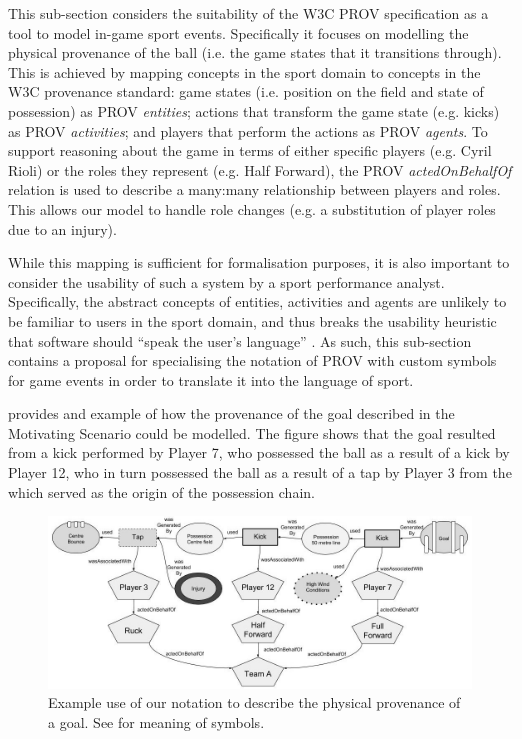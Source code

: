 {This sub-section considers the suitability of the W3C PROV
specification as a tool to model in-game sport events. Specifically it
focuses on modelling the physical provenance of the ball (i.e. the game
states that it transitions through). This is achieved by mapping concepts in the
sport domain to concepts in the W3C provenance standard: game states (i.e. position on the field and state
of possession) as PROV \textit{entities}; actions that transform the game
state (e.g. kicks) as PROV \textit{activities}; and players that perform the
actions as PROV \textit{agents}. To support reasoning about the game in terms
of either specific players (e.g. Cyril Rioli) or the roles they
represent (e.g. Half Forward), the PROV
\textit{actedOnBehalfOf} relation is used to describe a many:many relationship
between players and roles. This allows our model to handle role changes
(e.g. a substitution of player roles due to an injury).}

{}

{While this mapping is sufficient for formalisation purposes, it is also important
to consider the usability of such a system by a sport performance
analyst. Specifically, the abstract concepts of entities, activities and
agents are unlikely to be familiar to users in the sport domain, and
thus breaks the usability heuristic that software should ``speak the
user's language'' \cite{Nielsen1994}. As such, this sub-section contains a proposal for specialising
the notation of PROV with custom symbols for game events in order to
translate it into the language of sport.

{ provides and example of how the provenance of the goal described in
the Motivating Scenario could be modelled. The figure shows that the goal resulted from a kick performed by Player 7, who
possessed the ball as a result of a kick by Player 12, who in turn
possessed the ball as a result of a tap by Player 3 from the \centrebounce{} which served as the origin of the possession chain.}

\begin{figure}[!htb]
\includegraphics[width=\linewidth]{figs/paper/image2.jpg}
\caption{Example use of our notation to describe the
physical provenance of a goal. See  for meaning of symbols.}
\label{PhysExample}
\end{figure}
}

